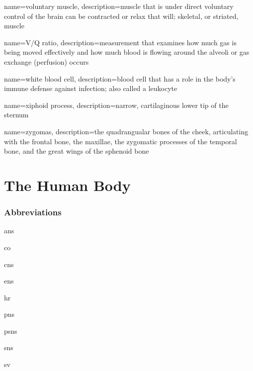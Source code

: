 \documentclass[../../EMT-169.tex]{subfiles}
\begin{document}
	{
		name=voluntary muscle,
		description={muscle that is under direct voluntary control of the brain can be contracted or relax that will; skeletal, or striated, muscle}
	}
	
	{
		name=V/Q ratio,
		description={measurement that examines how much gas is being moved effectively and how much blood is flowing around the alveoli or gas exchange (perfusion) occurs}
	}
	
	{
		name=white blood cell,
		description={blood cell that has a role in the body's immune defense against infection; also called a leukocyte}
	}
	
	{
		name=xiphoid process,
		description={narrow, cartilaginous lower tip of the sternum}
	}
	
	{
		name=zygomas,
		description={the quadrangualar bones of the cheek, articulating with the frontal bone, the maxillae, the zygomatic processes of the temporal bone, and the great wings of the sphenoid bone}
	}

\chapter{The Human Body}

\subsection*{Abbreviations}
\begin{description}[leftmargin=!,labelwidth=\widthof{\bfseries ABCDF}]
	\item [\acrshort{ans}] 			\acrlong{ans}
	\item [\acrshort{co}] 			\acrlong{co}
	\item [\acrshort{cns}] 			\acrlong{cns}
	\item [\acrshort{ens}] 			\acrlong{ens}
	\item [\acrshort{hr}] 			\acrlong{hr}
	\item [\acrshort{pns}] 			\acrlong{pns}
	\item [\acrshort{psns}] 		\acrlong{psns}
	\item [\acrshort{sns}] 			\acrlong{sns}
	\item [\acrshort{sv}] 			\acrlong{sv}
\end{description}\hfill \\
\end{document}
